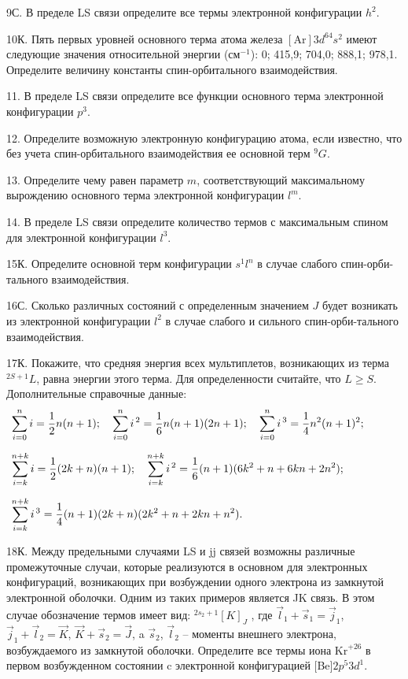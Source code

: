 \par
9С. В пределе LS связи определите все термы электронной конфигурации $h^2$.
\par
10К.  Пять первых уровней основного терма атома железа $[\text{Ar}]3d^64s^2$ имеют следующие значения относительной энергии (см$^{-1}$): 0; 415,9; 704,0; 888,1; 978,1. Определите величину константы спин-орбитального взаимодействия.
\par
11. В пределе LS связи определите все функции основного терма электронной конфигурации $p^3$.
\par
12. Определите возможную электронную конфигурацию атома, если известно, что без учета спин-орбитального взаимодействия ее основной терм $^9G$.
\par
13. Определите чему равен параметр $m$, соответствующий максимальному вырождению основного терма электронной конфигурации $l^m$.
\par
14. В пределе LS связи определите количество термов с максимальным спином для электронной конфигурации $l^3$.
\par
15К. Определите основной терм конфигурации $s^1l^n$ в случае слабого спин-орби-тального взаимодействия.
\par
16С. Сколько различных состояний с определенным значением $J$ будет возникать из электронной конфигурации $l^2$ в случае слабого и сильного спин-орби-тального взаимодействия.
\par
17К. Покажите, что средняя энергия всех мультиплетов, возникающих из терма $^{2S+1}L$, равна энергии этого терма. Для определенности считайте, что $L\ge S$. Дополнительные справочные данные:
\begin{equation*}
\begin{aligned}
&\sum_{i=0}^{n} i = \frac{1}{2}n(n+1);\quad \sum_{i=0}^{n} i^{\,2} = \frac{1}{6}n(n+1)(2n+1);\quad \sum_{i=0}^{n} i^{\,3} = \frac{1}{4}n^2(n+1)^2;\hspace{11mm}
\\[6pt]
 &\sum_{i=k}^{n+k} i = \frac{1}{2}(2k+n)(n+1);\quad \sum_{i=k}^{n+k} i^{\,2} = \frac{1}{6}(n+1)(6k^2+n+6kn+2n^2);\,
 \\[6pt]
&\sum_{i=k}^{n+k} i^{\,3} = \frac{1}{4}(n+1)(2k+n)(2k^2+n+2kn+n^2).
\end{aligned}
\end{equation*}
\par
18К. Между предельными случаями LS и jj связей возможны различные промежуточные случаи, которые реализуются в основном для электронных конфигураций, возникающих при возбуждении одного электрона из замкнутой электронной оболочки. Одним из таких примеров является JK связь. В этом случае обозначение термов имеет вид: $^{2s_2+1}[K]_J$ , где $\vec{l}_1+\vec{s}_1=\vec{j}_1$, $\vec{j}_1+\vec{l}_2=\vec{K}$, $\vec{K}+\vec{s}_2=\vec{J}$, a $\vec{s}_2$, $\vec{l}_2$ – моменты внешнего электрона, возбуждаемого из замкнутой оболочки. Определите все термы иона $\text{Kr}^{+26}$ в первом возбужденном состоянии c электронной конфигурацией $[$Be$]2p^5 3d^1$.
